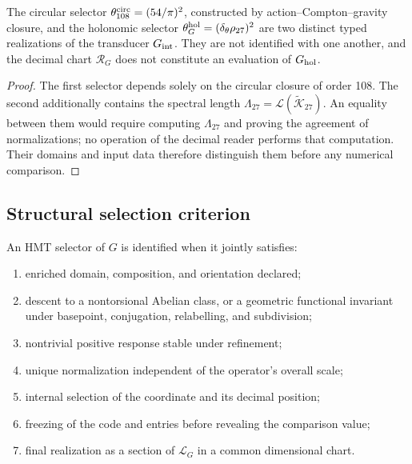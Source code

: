 \begin{proposition}
\label{prop:separacion-selectores-G}
The circular selector
\(\theta_{108}^{\rm circ}=(54/\pi)^2\), constructed by action--Compton--gravity
closure, and the holonomic selector
\(\theta_G^{\rm hol}=(\delta_\theta\rho_{27})^2\) are two distinct typed realizations
of the transducer \(G_{\rm int}\).  They are not identified with
one another, and the decimal chart \(\mathscr R_G\) does not constitute an evaluation of
\(G_{\rm hol}\).
\end{proposition}
\begin{proof}
The first selector depends solely on the circular closure of order 108. The second additionally contains the spectral length \(\Lambda_{27}=\mathscr L(\widetilde{\mathcal K}_{27})\). An equality between them would require computing \(\Lambda_{27}\) and proving the agreement of normalizations; no operation of the decimal reader performs that computation. Their domains and input data therefore distinguish them before any numerical comparison.
\end{proof}

\subsection{Structural selection criterion}

\begin{criterion}
\label{crit:selector-G-rev11}
An HMT selector of \(G\) is identified when it jointly satisfies:
\begin{enumerate}
 \item enriched domain, composition, and orientation declared;
 \item descent to a nontorsional Abelian class, or a geometric functional
 invariant under basepoint, conjugation, relabelling, and subdivision;
 \item nontrivial positive response stable under refinement;
 \item unique normalization independent of the operator's overall scale;
 \item internal selection of the coordinate and its decimal position;
 \item freezing of the code and entries before revealing the
 comparison value;
 \item final realization as a section of \(\mathcal L_G\) in a common
 dimensional chart.
\end{enumerate}
\end{criterion}

